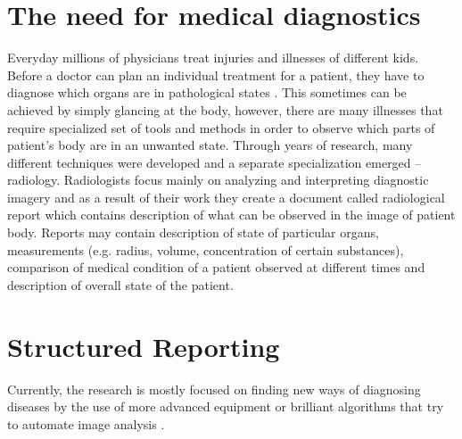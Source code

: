 \documentclass[12pt, twoside, openany]{report}
\theoremstyle{definition}
\begin{document}
\section{The need for medical diagnostics}
Everyday millions of physicians treat injuries and illnesses of different kids. Before a doctor can plan an individual treatment for a patient, they have to diagnose which organs are in pathological states \cite{bls}. This sometimes can be achieved by simply glancing at the body, however, there are many illnesses that require specialized set of tools and methods in order to observe which parts of patient's body are in an unwanted state. Through years of research, many different techniques were developed and a separate specialization emerged -- radiology. Radiologists focus mainly on analyzing and interpreting diagnostic imagery and as a result of their work they create a document called radiological report which contains description of what can be observed in the image of patient body. Reports may contain description of state of particular organs, measurements (e.g. radius, volume, concentration of certain substances), comparison of medical condition of a patient observed at different times and description of overall state of the patient.

\section{Structured Reporting}
Currently, the research is mostly focused on finding new ways of diagnosing diseases by the use of more advanced equipment or brilliant algorithms that try to automate image analysis \cite{ai}. 
\end{document}
